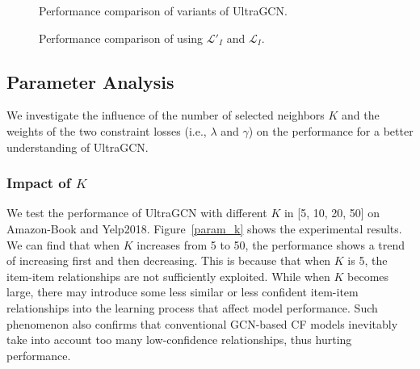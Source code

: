 \documentclass[sigconf,authorversion]{acmart}
\begin{document}
\begin{figure}[!t]
   \vspace{-2ex}
	\centering  {}
	\vspace{-2ex}
	\caption{Performance comparison of variants of UltraGCN.}
	\label{fig_ablation_study}
\end{figure}





\begin{figure}[!t]
   \vspace{-3ex}
	\centering  {}
	\vspace{-2ex}
	\caption{Performance comparison of using $\mathcal{L'}_I$ and $\mathcal{L}_I$.}
	\label{fig_ablation_study_ii}
	\vspace{-2ex}
\end{figure}



\subsection{Parameter Analysis}
We investigate the influence of the number of selected neighbors $K$ and the weights of the two constraint losses (i.e., $\lambda$ and $\gamma$) on the performance for a better understanding of UltraGCN.

\subsubsection{Impact of $K$}
We test the performance of UltraGCN with different $K$ in [5, 10, 20, 50] on Amazon-Book and Yelp2018. Figure~\ref{param_k} shows the experimental results. We can find that when $K$ increases from 5 to 50, the performance shows a trend of increasing first and then decreasing. This is because that when $K$ is 5, the item-item relationships are not sufficiently exploited. While when $K$ becomes large, there may introduce some less similar or less confident item-item relationships into the learning process that affect model performance. Such phenomenon also confirms that conventional GCN-based CF models inevitably take into account too many low-confidence relationships, thus hurting performance.  
\end{document}
